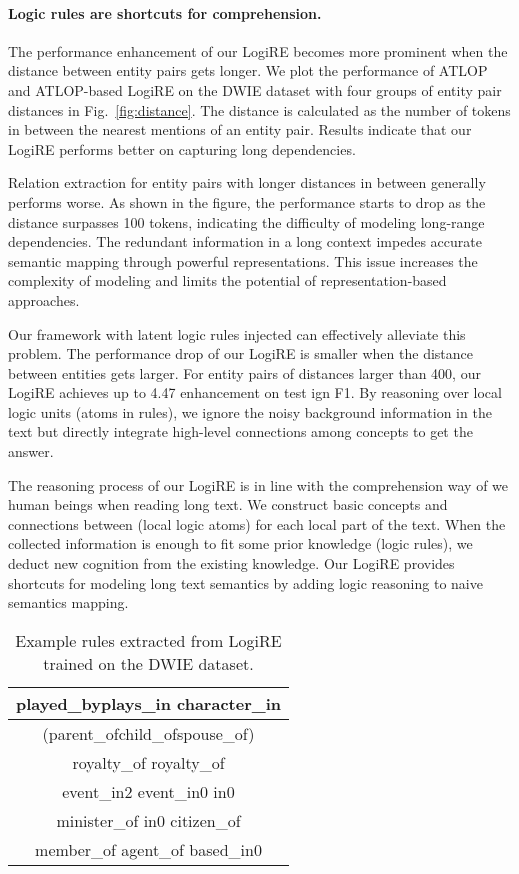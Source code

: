 \documentclass[11pt]{article}
\newcommand{\mymodel}{LogiRE\xspace}
\begin{document}
\paragraph{Logic rules are shortcuts for comprehension.}
The performance enhancement of our \mymodel becomes more prominent when the distance between entity pairs gets longer. We plot the performance of ATLOP and ATLOP-based \mymodel on the DWIE dataset with four groups of entity pair distances in Fig.~\ref{fig:distance}. The distance is calculated as the number of tokens in between the nearest mentions of an entity pair. Results indicate that our \mymodel performs better on capturing long dependencies.

Relation extraction for entity pairs with longer distances in between generally performs worse. As shown in the figure, the performance starts to drop as the distance surpasses 100 tokens, indicating the difficulty of modeling long-range dependencies. The redundant information in a long context impedes accurate semantic mapping through powerful representations. This issue increases the complexity of modeling and limits the potential of representation-based approaches.

Our framework with latent logic rules injected can effectively alleviate this problem. The performance drop of our \mymodel is smaller when the distance between entities gets larger. For entity pairs of distances larger than 400, our \mymodel achieves up to 4.47 enhancement on test ign F1. By reasoning over local logic units (atoms in rules), we ignore the noisy background information in the text but directly integrate high-level connections among concepts to get the answer.

The reasoning process of our \mymodel is in line with the comprehension way of we human beings when reading long text. We construct basic concepts and connections between (local logic atoms) for each local part of the text. When the collected information is enough to fit some prior knowledge (logic rules), we deduct new cognition from the existing knowledge. Our \mymodel provides shortcuts for modeling long text semantics by adding logic reasoning to naive semantics mapping.


\begin{table}[t]
    \small
    \centering
    \begin{tabular}{c}
    \toprule
        played\_byplays\_in character\_in   \\ \hline
        (parent\_ofchild\_ofspouse\_of) \\  royalty\_of royalty\_of  \\ \hline
        event\_in2 event\_in0 in0 \\ \hline
        minister\_of in0 citizen\_of \\ \hline
        member\_of agent\_of based\_in0\\
        \bottomrule
    \end{tabular}
    \caption{Example rules extracted from \mymodel trained on the DWIE dataset.}
    \label{tab:induct}
\end{table}
\end{document}
